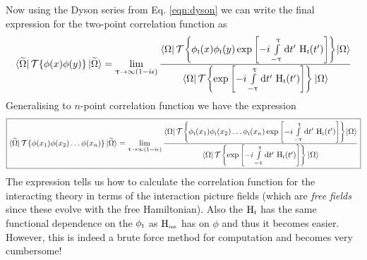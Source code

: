 Now using the Dyson series from Eq. \ref{eqn:dyson} we can write the final expression for the two-point correlation function as 
\begin{align*}
     { \bra{\widetilde{\Omega}}\mathcal T\{\phi(x)\phi(y)\} \ket{\widetilde{\Omega}}}=\lim\limits_{\uptau \to \infty(1-i\epsilon)}\frac{\bra{\Omega}\mathcal T\qty{ \phi_{\text{\tiny I}}(x) \phi_{\text{\tiny I}}(y) \exp\qty[-i \int\limits_{-\uptau}^\uptau\dd t' \ \mathrm{H}_{\text{\tiny I}}(t')]  }{\ket{\Omega}}}{\bra{\Omega} \mathcal T \qty{ \exp\qty[-i \int\limits_{-\uptau}^\uptau\dd t' \ \mathrm{H}_{\text{\tiny I}}(t')]}\ket{\Omega}}
\end{align*}
Generalising to $n$-point correlation function we have the expression 
\begin{equation}\label{eqn:green}
    \boxed{{ \bra{\widetilde{\Omega}} \mathcal T\{\phi(x_1)\phi(x_2)\ldots \phi(x_n) \} \ket{\widetilde{\Omega}}}=\lim\limits_{\uptau \to \infty(1-i\epsilon)}\frac{\bra{\Omega}\mathcal T\qty{ \phi_{\text{\tiny I}}(x_1) \phi_{\text{\tiny I}}(x_2)\ldots \phi_{\text{\tiny I}}(x_n) \exp\qty[-i \int\limits_{-\uptau}^\uptau\dd t' \ \mathrm{H}_{\text{\tiny I}}(t')]  }{\ket{\Omega}}}{\bra{\Omega} \mathcal T \qty{ \exp\qty[-i \int\limits_{-\uptau}^\uptau\dd t' \ \mathrm{H}_{\text{\tiny I}}(t')]}\ket{\Omega}}}
\end{equation}
The expression tells us how to calculate the correlation function for the interacting theory in terms of the interaction picture fields (which are \textit{free fields} since these evolve with the free Hamiltonian). Also the $\mathrm{H}_{\text{\tiny I}}$ has the same functional dependence on the $\phi_{\text{\tiny I}}$ as  $\mathrm{H}_{\text{\tiny int}}$ has on $\phi$ and thus it becomes easier. However, this is indeed a brute force method for computation and becomes very cumbersome!